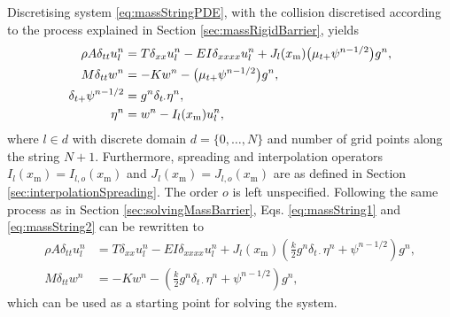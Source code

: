 Discretising system \eqref{eq:massStringPDE}, with the collision discretised according to the process explained in Section \ref{sec:massRigidBarrier}, yields
\begin{subequations}
    \begin{align}   
        \rho A \delta_{tt}u^n_l & =T\delta_{xx}u^n_l - EI\delta_{xxxx}u_l^n + J_l(x_\text{m}) \big(\mu_{t+}\psi^{n-1/2}\big)g^n, \label{eq:massString1}\\
        M \delta_{tt}w^n &=-Kw^n - \big(\mu_{t+}\psi^{n-1/2}\big)g^n,\label{eq:massString2}\\
        \delta_{t+}\psi^{n-1/2} &= g^n\delta_{t\cdot}\eta^n,\label{eq:massString3}\\
        \eta^n &= w^n - I_l(x_\text{m})u_l^n,\label{eq:massString4}
    \end{align}
\end{subequations}
where $l\in d$ with discrete domain $d=\{0, \hdots, N\}$ and number of grid points along the string $N+1$. Furthermore, spreading and interpolation operators $I_l(x_\text{m}) = I_{l, o}(x_\text{m})$ and $J_l(x_\text{m}) = J_{l, o}(x_\text{m})$ are as defined in Section \ref{sec:interpolationSpreading}. The order $o$ is left unspecified. Following the same process as in Section \ref{sec:solvingMassBarrier}, Eqs. \eqref{eq:massString1} and \eqref{eq:massString2} can be rewritten to 
\begin{subequations}\label{eq:massStringComb}
    \begin{align}
        \rho A \delta_{tt}u^n_l & =T\delta_{xx}u^n_l - EI\delta_{xxxx}u_l^n + J_l(x_\text{m}) \left(\frac{k}{2}g^n\delta_{t\cdot}\eta^n + \psi^{n-1/2}\right)g^n,\label{eq:massStringComb1}\\
        M \delta_{tt}w^n &=-Kw^n - \left(\frac{k}{2}g^n\delta_{t\cdot}\eta^n + \psi^{n-1/2}\right)g^n,\label{eq:massStringComb2}
    \end{align}
\end{subequations}
which can be used as a starting point for solving the system.

